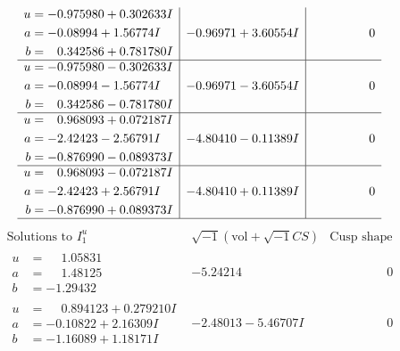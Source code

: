 \documentclass[1p]{elsarticle_modified}
\theoremstyle{definition}
\newcommand{\I}{\sqrt{-1}}
\begin{document}
$$\begin{array}{c|c|c}
\begin{aligned}
u &= -0.975980 + 0.302633 I \\
a &= -0.08994 + 1.56774 I \\
b &= \phantom{-}0.342586 + 0.781780 I\end{aligned}
 & -0.96971 + 3.60554 I & \phantom{-0.000000 } 0 \\ \hline\begin{aligned}
u &= -0.975980 - 0.302633 I \\
a &= -0.08994 - 1.56774 I \\
b &= \phantom{-}0.342586 - 0.781780 I\end{aligned}
 & -0.96971 - 3.60554 I & \phantom{-0.000000 } 0 \\ \hline\begin{aligned}
u &= \phantom{-}0.968093 + 0.072187 I \\
a &= -2.42423 - 2.56791 I \\
b &= -0.876990 - 0.089373 I\end{aligned}
 & -4.80410 - 0.11389 I & \phantom{-0.000000 } 0 \\ \hline\begin{aligned}
u &= \phantom{-}0.968093 - 0.072187 I \\
a &= -2.42423 + 2.56791 I \\
b &= -0.876990 + 0.089373 I\end{aligned}
 & -4.80410 + 0.11389 I & \phantom{-0.000000 } 0\\
 \hline 
 \end{array}$$\newpage$$\begin{array}{c|c|c}  
\text{Solutions to }I^u_{1}& \I (\text{vol} + \sqrt{-1}CS) & \text{Cusp shape}\\
 \hline 
\begin{aligned}
u &= \phantom{-}1.05831\phantom{ +0.000000I} \\
a &= \phantom{-}1.48125\phantom{ +0.000000I} \\
b &= -1.29432\phantom{ +0.000000I}\end{aligned}
 & -5.24214\phantom{ +0.000000I} & \phantom{-0.000000 } 0 \\ \hline\begin{aligned}
u &= \phantom{-}0.894123 + 0.279210 I \\
a &= -0.10822 + 2.16309 I \\
b &= -1.16089 + 1.18171 I\end{aligned}
 & -2.48013 - 5.46707 I & \phantom{-0.000000 } 0 \\ \hline\begin{aligned}

\end{aligned}
\end{array}$$
\end{document}

